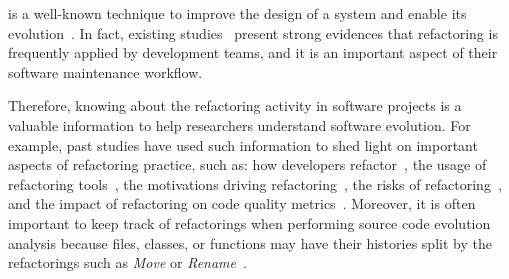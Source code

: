 



% 
% 
% 
% 
 is a well-known technique to improve the design of a system and enable its evolution~\cite{Fowler:1999}.
In fact, existing studies~\cite{MurphyHill2012, tsantalis_empiricalstudy, Kim:2012:FSE, kim-tse-2014, fse2016-why-we-refactor} present strong evidences that refactoring is frequently applied by development teams, and it is an important aspect of their software maintenance workflow.


Therefore, knowing about the refactoring activity in software projects is a valuable information to help researchers understand software evolution.
For example, past studies have used such information to shed light on important aspects of refactoring practice, such as: how developers refactor~\cite{MurphyHill2012}, the usage of refactoring tools~\cite{negara2013, MurphyHill2012}, the motivations driving refactoring~\cite{Kim:2012:FSE, kim-tse-2014, fse2016-why-we-refactor}, the risks of refactoring~\cite{Kim:2012:FSE, kim-tse-2014, Kim:2011, weissgerber2006refactorings, bavota2012does}, and the impact of refactoring on code quality metrics~\cite{Kim:2012:FSE, kim-tse-2014}.
Moreover, it is often important to keep track of refactorings when performing source code evolution analysis because files, classes, or functions may have their histories split by the refactorings such as \emph{Move} or \emph{Rename}~\cite{icse2018}.

